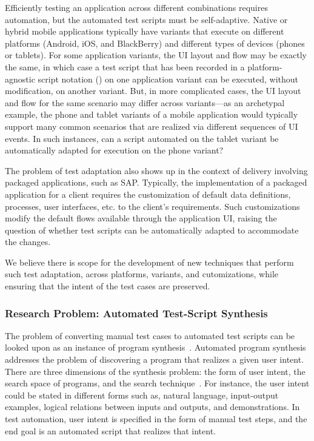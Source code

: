 Efficiently testing an application across different combinations requires
automation, but the automated test scripts must be self-adaptive. Native or
hybrid mobile applications typically have variants that execute on different
platforms (\eg Android, iOS, and BlackBerry) and different types of devices
(phones or tablets). For some application variants, the UI layout and flow may
be exactly the same, in which case a test script that has been recorded in a
platform-agnostic script notation (\eg \cite{PerfectoScriptOnce}) on one
application variant can be executed, without modification, on another
variant. But, in more complicated cases, the UI layout and flow for the same
scenario may differ across variants---as an archetypal example, the phone and
tablet variants of a mobile application would typically support many common
scenarios that are realized via different sequences of UI events. In such
instances, can a script automated on the tablet variant be automatically adapted
for execution on the phone variant?

The problem of test adaptation also shows up in the context of delivery
involving packaged applications, such as SAP. Typically, the implementation of a
packaged application for a client requires the customization of default data
definitions, processes, user interfaces, etc. to the client's requirements. Such
customizations modify the default flows available through the application UI,
raising the question of whether test scripts can be automatically adapted to
accommodate the changes.

We believe there is scope for the development of new techniques that perform
such test adaptation, across platforms, variants, and cutomizations, while
ensuring that the intent of the test cases are preserved.

\subsubsection*{Research Problem: Automated Test-Script Synthesis}

The problem of converting manual test cases to automated test scripts can be
looked upon as an instance of program synthesis~\cite{Gulwani:2010}.  Automated
program synthesis addresses the problem of discovering a program that realizes a
given user intent. There are three dimensions of the synthesis problem: the form
of user intent, the search space of programs, and the search
technique~\cite{Gulwani:2010}. For instance, the user intent could be stated in
different forms such as, natural language, input-output examples, logical
relations between inputs and outputs, and demonstrations. In test automation,
user intent is specified in the form of manual test steps, and the end goal is
an automated script that realizes that intent.

